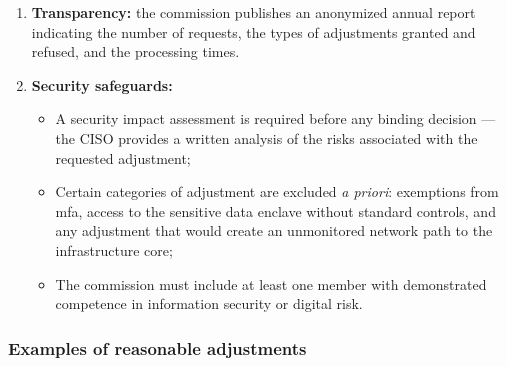 \begin{enumerate}
    \item \textbf{Transparency:} the commission publishes an
    anonymized annual report indicating the number of requests, the types
    of adjustments granted and refused, and the processing times.

    \item \textbf{Security safeguards:}
    \begin{itemize}[nosep]
        \item A security impact assessment is required before any binding
        decision --- the CISO provides a written analysis of the risks
        associated with the requested adjustment;
        \item Certain categories of adjustment are excluded \emph{a priori}:
        exemptions from \gls{mfa}, access to the
        sensitive data enclave without standard controls, and any
        adjustment that would create an unmonitored network path to
        the infrastructure core;
        \item The commission must include at least one member with
        demonstrated competence in information security or digital risk.
    \end{itemize}
\end{enumerate}

\subsubsection{Examples of reasonable adjustments}

